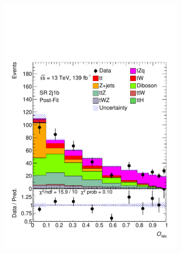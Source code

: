 \begin{figure}[!h]
\begin{subfigure}[b]{0.33\linewidth}
    \includegraphics[width=\textwidth]{ubonn-thesis/Chapters/Chapters_07/Figure/Data/SR_2j1b_postFit.pdf} 
  \end{subfigure} 
  \begin{subfigure}[b]{0.33\linewidth}
    \centering

\end{subfigure}
\end{figure}
